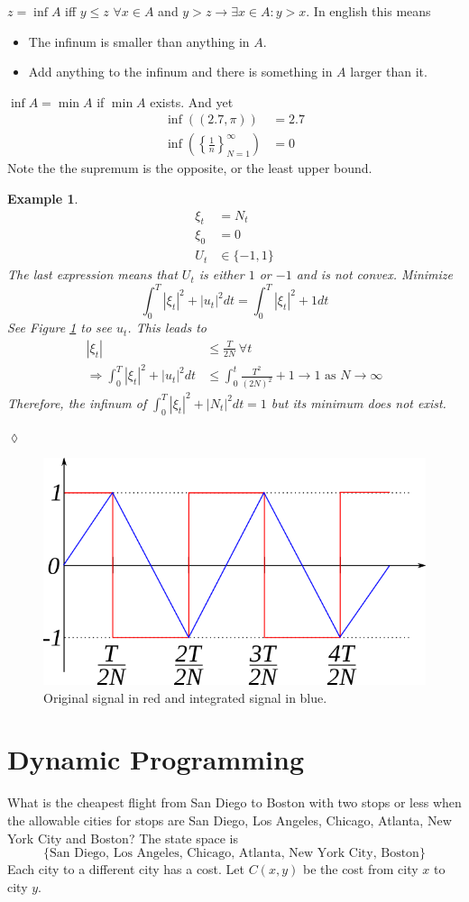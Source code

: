 \documentclass[lecture,12pt,]{pcms-l}
\theoremstyle{example}
\newtheorem{example}{Example}[section]
\begin{document}
$z = \inf A$ iff $y\leq z$ $\forall x\in A$ and $y>z\to\exists x\in A: y>x$. In english this means
\begin{itemize}
\item The infinum is smaller than anything in $A$.
\item Add anything to the infinum and there is something in $A$ larger than it.
\end{itemize}
$\inf A = \min A$ if $\min A$ exists. And yet
\begin{align*}
\inf((2.7,\pi)) &= 2.7 \\
\inf\left(\left\lbrace\frac{1}{n}\right\rbrace_{N=1}^\infty\right) &= 0
\end{align*}
Note the the supremum is the opposite, or the least upper bound.

\begin{example}
\begin{align*}
\xi_t &= N_t \\
\xi_0 &= 0 \\
U_t&\in\{-1,1\}
\end{align*}
The last expression means that $U_t$ is either $1$ or $-1$ and is not convex. Minimize
$$\int_0^T|\xi_t|^2 + |u_t|^2dt = \int_0^T|\xi_t|^2 + 1dt$$
See Figure \ref{fig:04signal} to see $u_t$. This leads to
\begin{align*}
|\xi_t| &\leq \frac{T}{2N} ~\forall t \\
\Rightarrow \int_0^T|\xi_t|^2+|u_t|^2dt &\leq \int_0^t\frac{T^2}{(2N)^2} + 1 \to 1 \text{ as } N\to\infty
\end{align*}
Therefore, the infinum of $\int_0^T|\xi_t|^2+|N_t|^2dt = 1$ but its minimum does not exist.
\end{example}
$\lozenge$

\begin{figure}[ht!]
	\centering
	\includegraphics[width=.4\textwidth]{images/04signal}
	\caption{Original signal in red and integrated signal in blue.}
	\label{fig:04signal}
\end{figure}

\section{Dynamic Programming}
What is the cheapest flight from San Diego to Boston with two stops or less when the allowable cities for stops are San Diego, Los Angeles, Chicago, Atlanta, New York City and Boston? The state space is
$$\{\text{San Diego, Los Angeles, Chicago, Atlanta, New York City, Boston}\}$$
Each city to a different city has a cost. Let $C(x,y)$ be the cost from city $x$ to city $y$.
\end{document}
